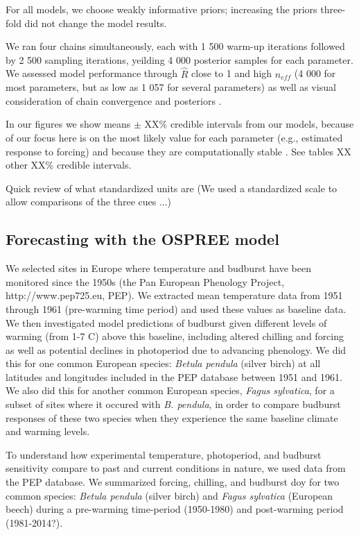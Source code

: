 \documentclass{article}
\begin{document}
\noindent For all models, we choose weakly informative priors; increasing the priors three-fold did not change the model results. 

We ran four chains simultaneously, each with 1 500 warm-up iterations followed by 2 500 sampling iterations, yeilding 4 000 posterior samples for each parameter. We assessed model performance through $\hat{R}$ close to 1 and high $n_{eff}$ (4 000 for most parameters, but as low as 1 057 for several parameters) as well as visual consideration of chain convergence and posteriors \citep{BDA}. 

In our figures  we show means $\pm$ XX\% credible intervals from our models, because of our focus here is on the most likely value for each parameter (e.g., estimated response to forcing) and because they are computationally stable \citep{BDA,Carpenter:2016aa}. See tables XX other XX\% credible intervals. 


\par Quick review of what standardized units are (We used a standardized scale to allow comparisons of the three cues ...)

\subsection*{Forecasting with the OSPREE model}
We selected sites in Europe where temperature and budburst have been monitored since the 1950s (the Pan European Phenology Project, http://www.pep725.eu, PEP). We extracted mean temperature data from 1951 through 1961 (pre-warming time period) and used these values as baseline data. We then investigated model predictions of budburst given different levels of warming (from 1-7 \degree C) above this baseline, including altered chilling and forcing as well as potential declines in photoperiod due to advancing phenology. We did this for one common European species: \emph{Betula pendula} (silver birch) at all latitudes and longitudes included in the PEP database between 1951 and 1961. We also did this for another common European species, \emph{Fagus sylvatica}, for a subset of sites where it occured with \emph{B. pendula}, in order to compare budburst responses of these two species when they experience the same baseline climate and warming levels.

\par To understand how experimental temperature, photoperiod, and budburst sensitivity compare to past and current conditions in nature, we used data from the PEP database. We summarized forcing, chilling, and budburst doy for two common species: \emph{Betula pendula} (silver birch) and \emph{Fagus sylvatica} (European beech) during a pre-warming time-period (1950-1980) and post-warming period (1981-2014?). 
\end{document}
